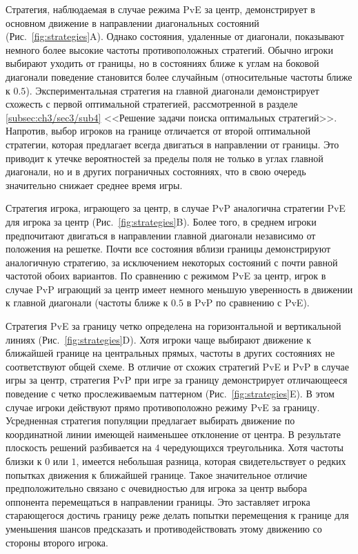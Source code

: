 Стратегия, наблюдаемая в случае режима PvE за центр, демонстрирует в основном движение в направлении диагональных состояний (Рис.~\cref{fig:strategies}A). Однако состояния, удаленные от диагонали, показывают немного более высокие частоты противоположных стратегий. Обычно игроки выбирают уходить от границы, но в состояниях ближе к углам на боковой диагонали поведение становится более случайным (относительные частоты ближе к $0.5$). Экспериментальная стратегия на главной диагонали демонстрирует схожесть с первой оптимальной стратегией, рассмотренной в разделе \cref{subsec:ch3/sec3/sub4} <<Решение задачи поиска оптимальных стратегий>>. Напротив, выбор игроков на границе отличается от второй оптимальной стратегии, которая предлагает всегда двигаться в направлении от границы. Это приводит к утечке вероятностей за пределы поля не только в углах главной диагонали, но и в других пограничных состояниях, что в свою очередь значительно снижает среднее время игры. 

Стратегия игрока, играющего за центр, в случае PvP аналогична стратегии PvE для игрока за центр (Рис.~\cref{fig:strategies}B). Более того, в среднем игроки предпочитают двигаться в направлении главной диагонали независимо от положения на решетке. Почти все состояния вблизи границы демонстрируют аналогичную стратегию, за исключением некоторых состояний с почти равной частотой обоих вариантов. По сравнению с режимом PvE за центр, игрок в случае PvP играющий за центр имеет немного меньшую уверенность в движении к главной диагонали (частоты ближе к $0.5$ в PvP по сравнению с PvE).

Стратегия PvE за границу четко определена на горизонтальной и вертикальной линиях (Рис.~\cref{fig:strategies}D). Хотя игроки чаще выбирают движение к ближайшей границе на центральных прямых, частоты в других состояниях не соответствуют общей схеме. В отличие от схожих стратегий PvE и PvP в случае игры за центр, стратегия PvP при игре за границу демонстрирует отличающееся поведение с четко прослеживаемым паттерном (Рис.~\cref{fig:strategies}E). В этом случае игроки действуют прямо противоположно режиму PvE за границу. Усредненная стратегия популяции предлагает выбирать движение по координатной линии имеющей наименьшее отклонение от центра. В результате плоскость решений разбивается на $4$ чередующихся треугольника. Хотя частоты близки к $0$ или $1$, имеется небольшая разница, которая свидетельствует о редких попытках движения к ближайшей границе. Такое значительное отличие предположительно связано с очевидностью для игрока за центр выбора оппонента перемещаться в направлении границы. Это заставляет игрока старающегося достичь границу реже делать попытки перемещения к границе для уменьшения шансов предсказать и противодействовать этому движению со стороны второго игрока.

